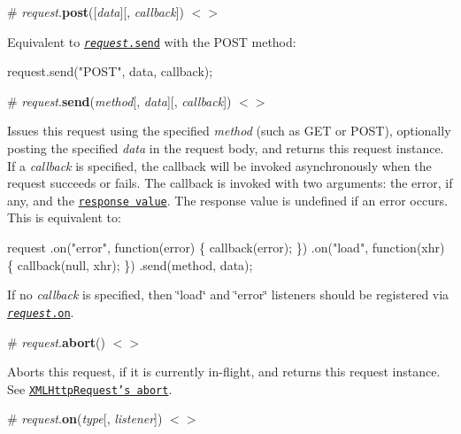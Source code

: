 \label{_request_post}%
\# {\itshape request}.{\bfseries post}(\mbox{[}{\itshape data}\mbox{]}\mbox{[}, {\itshape callback}\mbox{]}) \href{https://github.com/d3/d3-request/blob/master/src/request.js#L101}{\tt $<$$>$}

Equivalent to \href{#request_send}{\tt {\itshape request}.send} with the P\+O\+ST method\+:


\begin{DoxyCode}
request.send("POST", data, callback);
\end{DoxyCode}


\label{_request_send}%
\# {\itshape request}.{\bfseries send}({\itshape method}\mbox{[}, {\itshape data}\mbox{]}\mbox{[}, {\itshape callback}\mbox{]}) \href{https://github.com/d3/d3-request/blob/master/src/request.js#L106}{\tt $<$$>$}

Issues this request using the specified {\itshape method} (such as {\ttfamily G\+ET} or {\ttfamily P\+O\+ST}), optionally posting the specified {\itshape data} in the request body, and returns this request instance. If a {\itshape callback} is specified, the callback will be invoked asynchronously when the request succeeds or fails. The callback is invoked with two arguments\+: the error, if any, and the \href{#request_response}{\tt response value}. The response value is undefined if an error occurs. This is equivalent to\+:


\begin{DoxyCode}
request
    .on("error", function(error) \{ callback(error); \})
    .on("load", function(xhr) \{ callback(null, xhr); \})
    .send(method, data);
\end{DoxyCode}


If no {\itshape callback} is specified, then \char`\"{}load\char`\"{} and \char`\"{}error\char`\"{} listeners should be registered via \href{#request_on}{\tt {\itshape request}.on}.

\label{_request_abort}%
\# {\itshape request}.{\bfseries abort}() \href{https://github.com/d3/d3-request/blob/master/src/request.js#L121}{\tt $<$$>$}

Aborts this request, if it is currently in-\/flight, and returns this request instance. See \href{http://www.w3.org/TR/XMLHttpRequest/#the-abort%28%29-method}{\tt X\+M\+L\+Http\+Request’s abort}.

\label{_request_on}%
\# {\itshape request}.{\bfseries on}({\itshape type}\mbox{[}, {\itshape listener}\mbox{]}) \href{https://github.com/d3/d3-request/blob/master/src/request.js#L126}{\tt $<$$>$}

